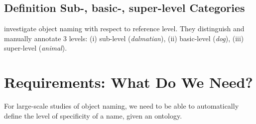 

	



\subsection{Definition Sub-, basic-, super-level Categories}
\cite{graf2016animal} investigate object naming with respect to reference level. They distinguish and manually annotate 3 levels: (i) sub-level (\textit{dalmatian}), (ii) basic-level (\textit{dog}), (iii) super-level (\textit{animal}).

\section{Requirements: What Do We Need? }
For large-scale studies of object naming, we need to be able to automatically define the level of specificity of a name, given an ontology. 